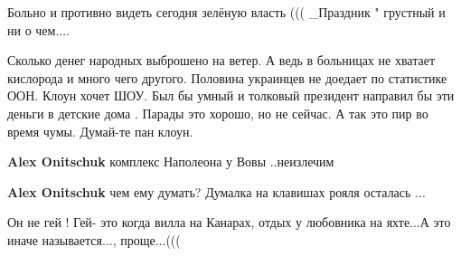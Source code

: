 \begin{itemize}
 
Больно и противно видеть сегодня зелёную власть ((( \_Праздник " грустный и ни о чем....

 

Сколько денег народных выброшено на ветер. А ведь в больницах не хватает
кислорода и много чего другого. Половина украинцев не доедает по статистике
ООН. Клоун хочет ШОУ. Был бы умный и толковый президент направил бы эти деньги
в детские дома . Парады это хорошо, но не сейчас. А так это пир во время чумы.
Думай-те пан клоун.

\begin{itemize}
 
\textbf{Alex Onitschuk} комплекс Наполеона у Вовы ..неизлечим

 
\textbf{Alex Onitschuk} чем ему думать? Думалка на клавишах рояля осталась ...
\end{itemize}

 
Он не гей ! Гей- это когда вилла на Канарах, отдых у любовника на яхте...А это иначе называется..., проще...(((

 

\end{itemize}
